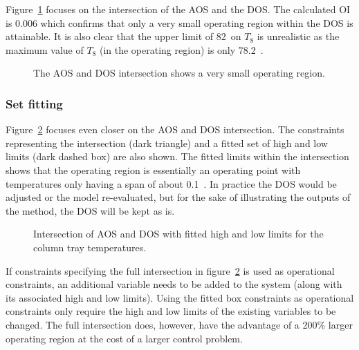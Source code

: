 Figure~\ref{fig:columnaosfocus} focuses on the intersection of the AOS and the DOS.
The calculated OI is 0.006 which confirms that only a very small operating region within the DOS is attainable.
It is also clear that the upper limit of 82~\textcelsius on $T_8$ is unrealistic as the maximum value of $T_8$ (in the operating region) is only 78.2~\textcelsius.

\begin{figure}[htbp]
  \centering
    \scalebox{1}{}  
  \caption[AOS and DOS intersection of the laboratory distillation column]{The AOS and DOS intersection shows a very small operating region.}
  \label{fig:columnaosfocus}
\end{figure}

\subsubsection{Set fitting}
Figure~\ref{fig:columnfitbox} focuses even closer on the AOS and DOS intersection.
The constraints representing the intersection (dark triangle) and a fitted set of high and low limits (dark dashed box) are also shown.
The fitted limits within the intersection shows that the operating region is essentially an operating point with temperatures only having a span of about 0.1~\textcelsius.
In practice the DOS would be adjusted or the model re-evaluated, but for the sake of illustrating the outputs of the method, the DOS will be kept as is.
  
\begin{figure}[htbp]
  \centering
    \scalebox{1}{}  
  \caption[Fitted constraints for the laboratory distillation column]{Intersection of AOS and DOS with fitted high and low limits for the column tray temperatures.}
  \label{fig:columnfitbox}
\end{figure}

If constraints specifying the full intersection in figure~\ref{fig:columnfitbox} is used as operational constraints, an additional variable needs to be added to the system (along with its associated high and low limits).
Using the fitted box constraints as operational constraints only require the high and low limits of the existing variables to be changed.
The full intersection does, however, have the advantage of a 200\% larger operating region at the cost of a larger control problem.

